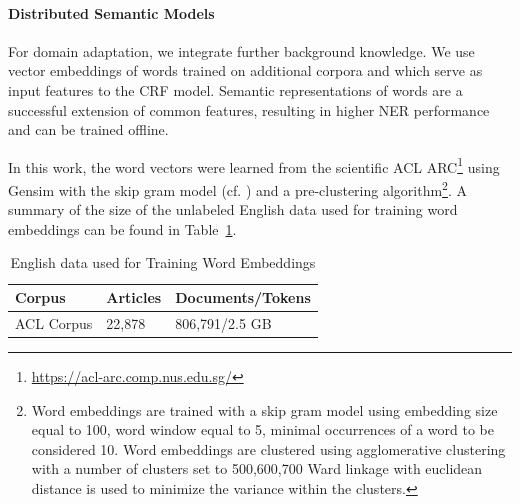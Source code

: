 \paragraph{Distributed Semantic Models}%
\label{subsec:dist-model}
For domain adaptation, we integrate further background knowledge. We use vector embeddings  of words trained on additional corpora and which serve as input features to the CRF model. Semantic representations of words are a successful extension of common features, resulting in higher NER performance~\cite{Turian} and can be trained offline.


In this work, the word vectors were learned  from the scientific ACL ARC\footnote{\url{https://acl-arc.comp.nus.edu.sg/}} using Gensim with the skip gram model (cf. \cite{mikolov2013distributed}) 
and a pre-clustering algorithm\footnote{
Word embeddings are trained with a skip gram model using embedding size equal to 100, word window equal to 5, minimal occurrences of a word to be considered 10. Word embeddings are clustered using agglomerative clustering with a number of clusters set to {500,600,700} Ward linkage with euclidean distance is used to minimize the variance within the clusters.}. A summary of the size of the unlabeled  English data used for training word embeddings can be found in Table~\ref{tab:UnlabeledData}.

\begin{table}
\center
\small
  \caption{English data used for Training Word Embeddings}
  \label{tab:UnlabeledData}
  \begin{tabular}{lll}
    \toprule
    Corpus & Articles &  Documents/Tokens  \\
    \midrule
   ACL Corpus
    &  22,878  &  806,791/2.5 GB \\ 
  \bottomrule
\end{tabular}
\end{table}

